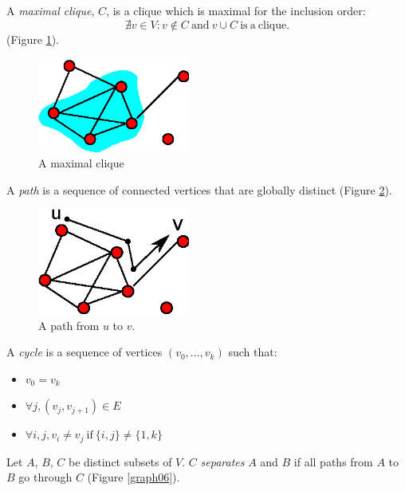 \documentclass[12pt]{report}
\begin{document}
\begin{definition}
 A \emph{maximal clique}, $C$, is a clique which is  maximal for the inclusion order: $$\nexists v
  \in V: v \notin C  \ \mathrm{and}\ v \cup C \ \mathrm{is \ a\  clique.} $$ (Figure
  \ref{graph04}).
\end{definition}

\begin{figure}[!ht]
  \centering
  \includegraphics[width=5cm]{./figures/graph04.eps}
  \caption{A maximal clique}
  \label{graph04}
\end{figure}

\FloatBarrier
\begin{definition}[path]
 A  \emph{path} is  a sequence of connected vertices that are globally distinct (Figure \ref{graph05}).
\end{definition}

\begin{figure}[ht]
  \centering
  \includegraphics[width=5cm]{./figures/graph05.eps}
  \caption{A path from $u$ to $v$.}
 \label{graph05}
 \end{figure}
\FloatBarrier

\begin{definition}[cycle]
 A \emph{cycle} is a sequence of vertices $(v_{0},\ldots,v_{k})$ such that: 
 \begin{itemize}
 \item $v_{0}=v_{k}$
 \item $\forall j,(v_{j},v_{j+1})\in E$
 \item $\forall i,j, v_{i}\neq v_{j}\ \mathrm{if}\ \lbrace i,j\rbrace\neq\lbrace 1,k\rbrace$
 \end{itemize}
\end{definition}

\begin{definition}
  Let $A$, $B$, $C$ be distinct subsets of $V$. $C$ \emph{separates} $A$ and
  $B$ if all paths from $A$ to $B$ go through $C$ (Figure
  \ref{graph06}).
\end{definition}
\end{document}
